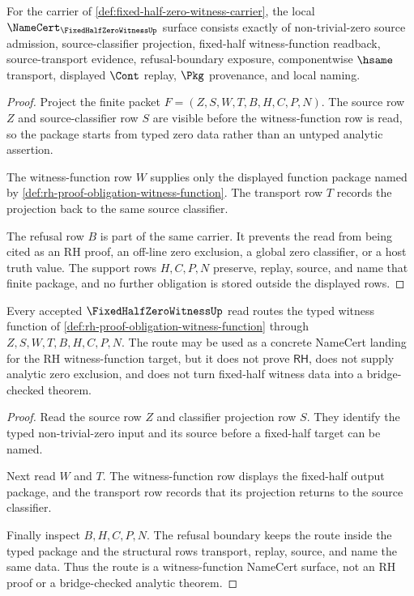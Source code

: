 \begin{theorem}
\label{thm:fixed-half-zero-witness-obligation-surface}
For the carrier of \autoref{def:fixed-half-zero-witness-carrier}, the local $\NameCert_{\FixedHalfZeroWitnessUp}$ surface consists exactly of non-trivial-zero source admission, source-classifier projection, fixed-half witness-function readback, source-transport evidence, refusal-boundary exposure, componentwise $\hsame$ transport, displayed $\Cont$ replay, $\Pkg$ provenance, and local naming.
\end{theorem}
\begin{proof}
Project the finite packet $F=(Z,S,W,T,B,H,C,P,N)$. The source row $Z$ and source-classifier row $S$ are visible before the witness-function row is read, so the package starts from typed zero data rather than an untyped analytic assertion.

The witness-function row $W$ supplies only the displayed function package named by \autoref{def:rh-proof-obligation-witness-function}. The transport row $T$ records the projection back to the same source classifier.

The refusal row $B$ is part of the same carrier. It prevents the read from being cited as an RH proof, an off-line zero exclusion, a global zero classifier, or a host truth value. The support rows $H,C,P,N$ preserve, replay, source, and name that finite package, and no further obligation is stored outside the displayed rows.
\end{proof}

\begin{theorem}
\label{thm:fixed-half-zero-witness-rh-witness-route}
Every accepted $\FixedHalfZeroWitnessUp$ read routes the typed witness function of \autoref{def:rh-proof-obligation-witness-function} through $Z,S,W,T,B,H,C,P,N$. The route may be used as a concrete NameCert landing for the RH witness-function target, but it does not prove $\mathsf{RH}$, does not supply analytic zero exclusion, and does not turn fixed-half witness data into a bridge-checked theorem.
\end{theorem}
\begin{proof}
Read the source row $Z$ and classifier projection row $S$. They identify the typed non-trivial-zero input and its source before a fixed-half target can be named.

Next read $W$ and $T$. The witness-function row displays the fixed-half output package, and the transport row records that its projection returns to the source classifier.

Finally inspect $B,H,C,P,N$. The refusal boundary keeps the route inside the typed package and the structural rows transport, replay, source, and name the same data. Thus the route is a witness-function NameCert surface, not an RH proof or a bridge-checked analytic theorem.
\end{proof}

